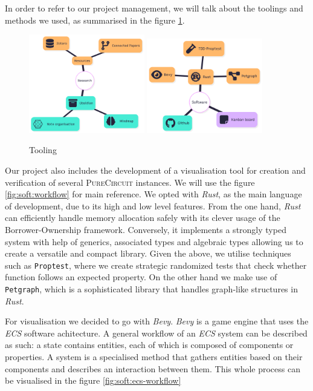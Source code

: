In order to refer to our project management, we will talk about the toolings and methods we used,
as summarised in the figure \ref{fig:management:tooling}.

\begin{figure}
    \includegraphics[width=0.45\textwidth]{assets/research-visualisation.png}
    \includegraphics[width=0.45\textwidth]{assets/software-map.png}
    \caption{Tooling}\label{fig:management:tooling}
\end{figure}

Our project also includes the development of a visualisation tool for creation
and verification of several \textsc{PureCircuit} instances. We will use the
figure \ref{fig:soft:workflow} for main reference. We opted with \textit{Rust},
as the main language of development, due to its high and low level features.
From the one hand, \textit{Rust} can efficiently handle memory allocation safely
with its clever usage of the Borrower-Ownership framework. Conversely, it implements
a strongly typed system with help of generics, associated types and algebraic types
allowing us to create a versatile and compact library. Given the above, we utilise
techniques such as \texttt{Proptest}, where we create strategic randomized tests
that check whether  function follows an expected property. On the other hand
we make use of \texttt{Petgraph}, which is a sophisticated library that handles
graph-like structures in \textit{Rust}.


For visualisation we decided to go with \textit{Bevy}. \textit{Bevy} is a
game engine that uses the \textit{ECS} software achitecture. A general
workflow of an \textit{ECS} system can be described as such: a state 
contains entities, each of which is composed of components or properties.
A system is a specialised method that gathers entities based on their components
and describes an interaction between them. This whole process can be visualised
in the figure \ref{fig:soft:ecs-workflow}


